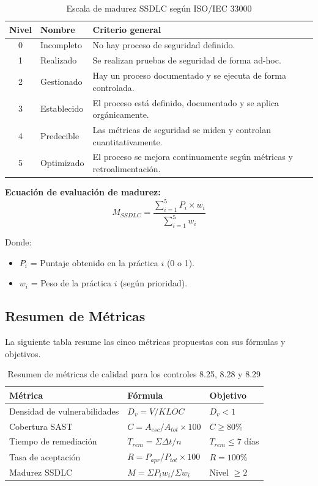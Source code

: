 \begin{table}[h]
\centering
\small
\begin{tabular}{|c|l|p{6cm}|}
\hline
\textbf{Nivel} & \textbf{Nombre} & \textbf{Criterio general} \\
\hline
0 & Incompleto & No hay proceso de seguridad definido. \\
1 & Realizado & Se realizan pruebas de seguridad de forma ad-hoc. \\
2 & Gestionado & Hay un proceso documentado y se ejecuta de forma controlada. \\
3 & Establecido & El proceso está definido, documentado y se aplica orgánicamente. \\
4 & Predecible & Las métricas de seguridad se miden y controlan cuantitativamente. \\
5 & Optimizado & El proceso se mejora continuamente según métricas y retroalimentación. \\
\hline
\end{tabular}
\caption{Escala de madurez SSDLC según ISO/IEC 33000}
\label{tab:madurez}
\end{table}

\textbf{Ecuación de evaluación de madurez:}
\begin{equation}
M_{SSDLC} = \frac{\sum_{i=1}^{5} P_i \times w_i}{\sum_{i=1}^{5} w_i}
\end{equation}

Donde:
\begin{itemize}
    \item $P_i$ = Puntaje obtenido en la práctica $i$ (0 o 1).
    \item $w_i$ = Peso de la práctica $i$ (según prioridad).
\end{itemize}

\subsection{Resumen de Métricas}

La siguiente tabla resume las cinco métricas propuestas con sus fórmulas y objetivos.

\begin{table}[h]
\centering
\small
\begin{tabular}{|l|l|l|}
\hline
\textbf{Métrica} & \textbf{Fórmula} & \textbf{Objetivo} \\
\hline
Densidad de vulnerabilidades & $D_v = V / KLOC$ & $D_v < 1$ \\
Cobertura SAST & $C = A_{esc} / A_{tot} \times 100$ & $C \geq 80\%$ \\
Tiempo de remediación & $T_{rem} = \Sigma \Delta t / n$ & $T_{rem} \leq 7$ días \\
Tasa de aceptación & $R = P_{apr} / P_{tot} \times 100$ & $R = 100\%$ \\
Madurez SSDLC & $M = \Sigma P_i w_i / \Sigma w_i$ & Nivel $\geq 2$ \\
\hline
\end{tabular}
\caption{Resumen de métricas de calidad para los controles 8.25, 8.28 y 8.29}
\label{tab:resumen-metricas}
\end{table}
